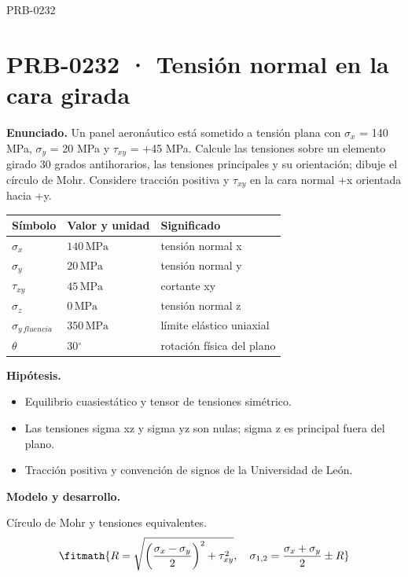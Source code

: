 \begin{studiumworked}{PRB-0232}

\section{PRB-0232 · Tensión normal en la cara girada}

\textbf{Enunciado.} Un panel aeronáutico está sometido a tensión plana con $\sigma_x$ = 140 MPa, $\sigma_y$ = 20 MPa y $\tau_{xy}$ = +45 MPa. Calcule las tensiones sobre un elemento girado 30 grados antihorarios, las tensiones principales y su orientación; dibuje el círculo de Mohr. Considere tracción positiva y $\tau_{xy}$ en la cara normal +x orientada hacia +y.

\par\medskip\noindent\begin{tabular}{@{}p{.18\linewidth}p{.26\linewidth}p{.48\linewidth}@{}}
\toprule Símbolo & Valor y unidad & Significado\\\midrule
$\sigma_{x}$ & $140\,\mathrm{MPa}$ & tensión normal x\\
$\sigma_{y}$ & $20\,\mathrm{MPa}$ & tensión normal y\\
$\tau_{xy}$ & $45\,\mathrm{MPa}$ & cortante xy\\
$\sigma_{z}$ & $0\,\mathrm{MPa}$ & tensión normal z\\
$\sigma_{y\,fluencia}$ & $350\,\mathrm{MPa}$ & límite elástico uniaxial\\
$\theta$ & $30{}^{\circ}$ & rotación física del plano\\
\bottomrule\end{tabular}\par\medskip

\textbf{Hipótesis.}\begin{itemize}\item Equilibrio cuasiestático y tensor de tensiones simétrico.
\item Las tensiones sigma xz y sigma yz son nulas; sigma z es principal fuera del plano.
\item Tracción positiva y convención de signos de la Universidad de León.\end{itemize}

\textbf{Modelo y desarrollo.}

Círculo de Mohr y tensiones equivalentes.\[\fitmath{R=\sqrt{\left(\frac{\sigma_x-\sigma_y}{2}\right)^2+\tau_{xy}^{2}},\quad\sigma_{1,2}=\frac{\sigma_x+\sigma_y}{2}\pm R}\]


\end{studiumworked}
